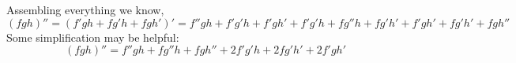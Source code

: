 \documentclass{article}
\begin{document}
\begin{enumerate}
  Assembling everything we know,
  \begin{equation*}
    (fgh)'' = (f'gh+fg'h+fgh')' 
    = f''gh + f'g'h + f'gh' + f'g'h + fg''h + fg'h' + f'gh' + fg'h' +
    fgh''
  \end{equation*}
  Some simplification may be helpful:
  \begin{equation*}
    (fgh)'' = f''gh + fg''h + fgh'' + 2f'g'h + 2fg'h' + 2f'gh'
  \end{equation*}

\end{enumerate}
\end{document}
